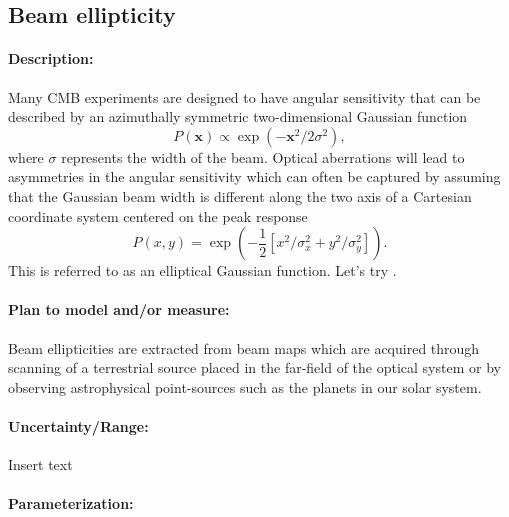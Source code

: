 \subsection{Beam ellipticity}

\paragraph{Description:}
Many CMB experiments are designed to have angular sensitivity that can be described by an azimuthally symmetric two-dimensional Gaussian function
\begin{equation} 
P (\mathbf{x}) \propto \exp (-\mathbf{x} ^2/2\sigma ^2),
\end{equation}
where $\sigma$ represents the width of the beam. Optical aberrations will lead to asymmetries in the angular sensitivity which can often be captured by assuming that the Gaussian beam width is different along the two axis of a Cartesian coordinate system centered on the peak response
\begin{equation}
P (x,y) = \exp (-\frac{1}{2}[x^2/\sigma ^2_x + y^2/\sigma ^2_y]).
\end{equation}
This is referred to as an elliptical Gaussian function. Let's try \cite{Takahashi2010}.

\paragraph{Plan to model and/or measure:}
Beam ellipticities are extracted from beam maps which are acquired through scanning of a terrestrial source placed in the far-field of the optical system or by observing astrophysical point-sources such as the planets in our solar system.

\paragraph{Uncertainty/Range:}
Insert text

\paragraph{Parameterization:}
